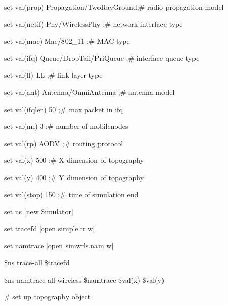 \documentclass[times,10pt,onecolumn]{article}
\begin{document}
set val(prop)    \hspace{20pt}       Propagation/TwoRayGround;\# radio-propagation model

set val(netif)   \hspace{19pt}      Phy/WirelessPhy            ;\# network interface type

set val(mac)     \hspace{21pt}       Mac/802\_11                 ;\# MAC type

set val(ifq)     \hspace{25pt}       Queue/DropTail/PriQueue    ;\# interface queue type

set val(ll)      \hspace{30pt}       LL                         ;\# link layer type

set val(ant)     \hspace{24pt}       Antenna/OmniAntenna        ;\# antenna model

set val(ifqlen)  \hspace{13pt}       50                         ;\# max packet in ifq

set val(nn)      \hspace{26pt}       3                          ;\# number of mobilenodes

set val(rp)      \hspace{26pt}       AODV                       ;\# routing protocol

set val(x)       \hspace{28pt}       500   			           ;\# X dimension of topography

set val(y)       \hspace{28pt}       400   			           ;\# Y dimension of topography  

set val(stop)	\hspace{18pt}	150			                   ;\# time of simulation end


set ns	\hspace{46pt}	  [new Simulator]

set tracefd   \hspace{27pt}    [open simple.tr w]

set namtrace  \hspace{18pt}    [open simwrls.nam w]  
  
\$ns trace-all \$tracefd

\$ns namtrace-all-wireless \$namtrace \$val(x) \$val(y)

\# set up topography object
\end{document}
